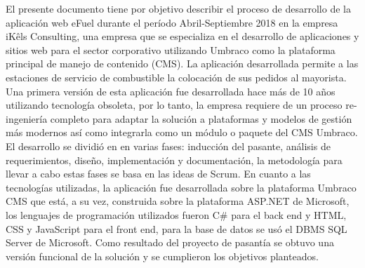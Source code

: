 \documentclass[pregrado]{tesis-usb}
\begin{document}
\frontmatter
\maketitle
\begin{resumen}
    El presente documento tiene por objetivo describir el proceso de desarrollo de la aplicación web eFuel durante el período Abril-Septiembre 2018 en la empresa iKêls Consulting, una empresa que se especializa en el desarrollo de aplicaciones y sitios web para el sector corporativo utilizando Umbraco como la plataforma principal de manejo de contenido (CMS). La aplicación desarrollada permite a las estaciones de servicio de combustible la colocación de sus pedidos al mayorista. Una primera versión de esta aplicación fue desarrollada hace más de 10 años utilizando tecnología obsoleta, por lo tanto, la empresa requiere de un proceso re-ingeniería completo para adaptar la solución a plataformas y modelos de gestión más modernos así como integrarla como un módulo o paquete del CMS Umbraco. El desarrollo se dividió en en varias fases: inducción del pasante, análisis de requerimientos, diseño, implementación y documentación, la metodología para llevar a cabo estas fases se basa en las ideas de Scrum. En cuanto a las tecnologías utilizadas, la aplicación fue desarrollada sobre la plataforma Umbraco CMS que está, a su vez, construida sobre la plataforma ASP.NET de Microsoft, los lenguajes de programación utilizados fueron C\# para el back end y HTML, CSS y JavaScript para el front end, para la base de datos se usó el DBMS SQL Server de Microsoft. Como resultado del proyecto de pasantía se obtuvo una versión funcional de la solución y se cumplieron los objetivos planteados.
\end{resumen}
\tableofcontents
\listoffigures

\mainmatter








\nocite{*}

\appendix



\end{document}
